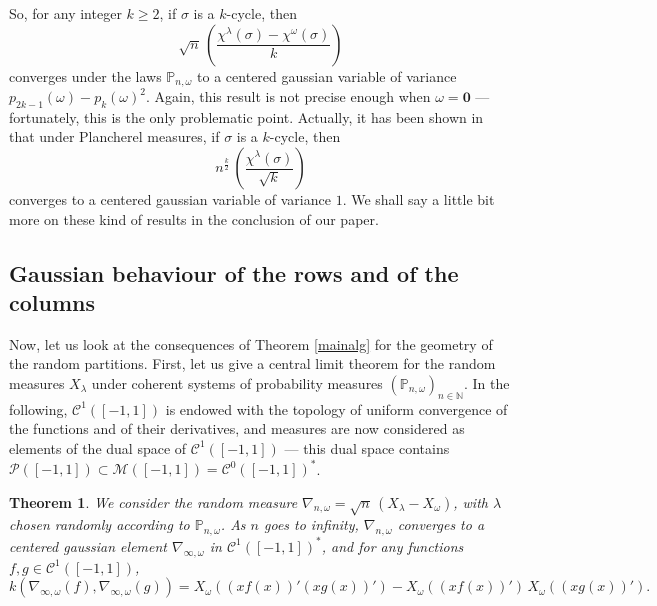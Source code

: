 \documentclass[smallextended,nospthms]{svjour3}
\newtheorem{theorem}{Theorem}
\theoremstyle{remark}
\newcommand{\N}{\mathbb{N}}
\newcommand{\proba}{\mathbb{P}}
\begin{document}
So, for any integer $k\geq 2$, if $\sigma$ is a $k$-cycle, then $$\sqrt{n}\,\left(\frac{\chi^{\lambda}(\sigma)-\chi^{\omega}(\sigma)}{k}\right)$$ converges under the laws $\proba_{n,\omega}$ to a centered gaussian variable of variance $p_{2k-1}(\omega)-p_{k}(\omega)^{2}$. Again, this result is not precise enough when $\omega=\mathbf{0}$ --- fortunately, this is the only problematic point. Actually, it has been shown in \cite[Theorem 6.1]{IO02} that under Plancherel measures, if $\sigma$ is a $k$-cycle, then $$n^{\frac{k}{2}}\,\left(\frac{\chi^{\lambda}(\sigma)}{\sqrt{k}}\right)$$ converges to a centered gaussian variable of variance $1$. We shall say a little bit more on these kind of results in the conclusion of our paper.

\subsection{Gaussian behaviour of the rows and of the columns}\label{gaussrow}
Now, let us look at the consequences of Theorem \ref{mainalg} for the geometry of the random partitions. First, let us give a central limit theorem for the random measures $X_{\lambda}$ under coherent systems of probability measures $(\proba_{n,\omega})_{n \in \N}$. In the following, $\mathscr{C}^{1}([-1,1])$ is endowed with the topology of uniform convergence of the functions and of their derivatives, and measures are now considered as elements of the dual space of $\mathscr{C}^{1}([-1,1])$ --- this dual space contains $\mathscr{P}([-1,1]) \subset \mathscr{M}([-1,1])=\mathscr{C}^{0}([-1,1])^{*}$.
\begin{theorem}\label{mainmeasure}
We consider the random measure $\nabla_{n,\omega}=\sqrt{n}\,(X_{\lambda}-X_{\omega})$, with $\lambda$ chosen randomly according to $\proba_{n,\omega}$. As $n$ goes to infinity, $\nabla_{n,\omega}$ converges to a centered gaussian element $\nabla_{\infty,\omega}$ in $\mathscr{C}^{1}([-1,1])^{*}$, and for any functions $f,g \in \mathscr{C}^{1}([-1,1])$, 
$$k(\nabla_{\infty,\omega}(f),\nabla_{\infty,\omega}(g))=X_{\omega}((xf(x))'(xg(x))')-X_{\omega}((xf(x))')\,X_{\omega}((xg(x))').$$
\end{theorem}
\end{document}
